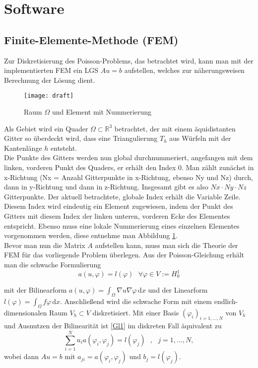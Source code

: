 \section{Software}

\subsection{Finite-Elemente-Methode (FEM)}
Zur Diskretisierung des Poisson-Problems, das betrachtet wird, kann man mit der implementierten FEM ein LGS $A u = b$ aufstellen, welches zur näherungsweisen Berechnung der Lösung dient. \\

\begin{figure}[h]
	\begin{center}
		\texttt{[image: draft]}
		
		\caption{Raum $\Omega$ und Element mit Nummerierung}\label{draft}
	\end{center}
\end{figure}

Als Gebiet wird ein Quader $\Omega \subset \mathbb{R}^{3}$ betrachtet, der mit einem äquidistanten Gitter so überdeckt wird, dass eine Triangulierung $T_h$ aus Würfeln mit der Kantenlänge $h$ entsteht. \\
Die Punkte des Gitters werden nun global durchnummeriert, angefangen mit dem linken, vorderen Punkt des Quaders, er erhält den Index 0. Man zählt zunächst in x-Richtung (Nx = Anzahl Gitterpunkte in x-Richtung, ebenso Ny und Nz) durch, dann in y-Richtung und dann in z-Richtung. Insgesamt gibt es also $Nx \cdot Ny \cdot Nz$ Gitterpunkte. Der aktuell betrachtete, globale Index erhält die Variable \glqq Zeile\grqq. Diesem Index wird eindeutig ein Element zugewiesen, indem der Punkt des Gitters mit diesem Index der linken unteren, vorderen Ecke des Elementes entspricht. Ebenso muss eine lokale Nummerierung eines einzelnen Elementes vorgenommen werden, diese entnehme man Abbildung \ref{draft}.\\

Bevor man nun die Matrix $A$ aufstellen kann, muss man sich die Theorie der FEM für das vorliegende Problem überlegen. 
Aus der Poisson-Gleichung erhält man die schwache Formulierung 
\begin{equation}
a(u, \varphi)=l( \varphi) \text{ } \forall \varphi \in V:=H^1_0 
\end{equation} \label{Gl1}


mit der Bilinearform $a(u, \varphi)=\int_\Omega \! \nabla u \nabla \varphi \, \mathrm{d}x $ und der Linearform $l( \varphi)= \int_\Omega \! f \varphi \, \mathrm{d}x $. Anschließend wird die schwache Form mit einem endlich-dimensionalen Raum $V_h \subset V$ diskretisiert. Mit einer Basis $(\varphi_i)_{i=1,...,N}$ von $V_h$ und Ausnutzen der Bilinearität ist \eqref{Gl1} im diskreten Fall äquivalent zu 
\begin{equation}
\sum_{i=1}^N u_i a(\varphi_i, \varphi_j)=l(\varphi_j) \text{ } , \text{ } j = 1,...,N,
\end{equation}
wobei dann $A u = b$ mit $a_{ji}=a(\varphi_i, \varphi_j)$ und $b_j=l(\varphi_j)$. \\

